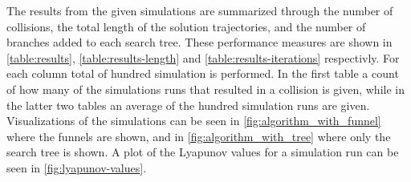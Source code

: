 
The results from the given simulations are summarized through the number of
collisions, the total length of the solution trajectories, and the number of
branches added to each search tree. These performance measures are shown in
\cref{table:results}, \cref{table:results-length}
and \cref{table:results-iterations} respectivly. For each column total of
hundred simulation is performed. In the first table a count of how many of the
simulations runs that resulted in a collision is given, while in the latter two tables an
average of the hundred simulation runs are given.
Visualizations of the simulations can be seen in \cref{fig:algorithm_with_funnel} where the funnels are shown, and in \cref{fig:algorithm_with_tree} where only the search tree is shown.
A plot of the Lyapunov values for a simulation run can be seen in \cref{fig:lyapunov-values}.


